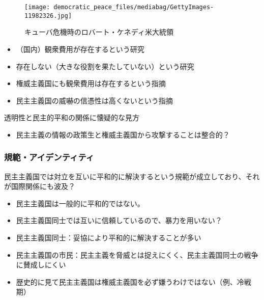 \documentclass[
  xelatex,
  ja=standard]{bxjsarticle}
\providecommand{\tightlist}{%
  \setlength{\itemsep}{0pt}\setlength{\parskip}{0pt}}\usepackage{longtable,booktabs,array}
\begin{document}
\begin{figure}[htpb]

{\centering \texttt{[image: democratic\_peace\_files/mediabag/GettyImages-11982326.jpg]}

}

\caption{キューバ危機時のロバート・ケネディ米大統領}

\end{figure}

\begin{itemize}
\tightlist
\item
  （国内）観衆費用が存在するという研究\citep{tomz2007, kurizaki2015}
\item
  存在しない（大きな役割を果たしていない）という研究\citep[\citet{katagiri2019}]{snyder2011, trachtenberg2012}
\item
  権威主義国にも観衆費用は存在するという指摘\citep{weiss2013, weeks2008}
\item
  民主主義国の威嚇の信憑性は高くないという指摘\citep{downes2012}
\end{itemize}

透明性と民主的平和の関係に懐疑的な見方\citep{finel1999}

\begin{itemize}
\tightlist
\item
  民主主義の情報の政策生と権威主義国から攻撃することは整合的？
\end{itemize}

\hypertarget{ux898fux7bc4ux30a2ux30a4ux30c7ux30f3ux30c6ux30a3ux30c6ux30a3}{%
\subsubsection{規範・アイデンティティ}\label{ux898fux7bc4ux30a2ux30a4ux30c7ux30f3ux30c6ux30a3ux30c6ux30a3}}

民主主義国では対立を互いに平和的に解決するという規範が成立しており、それが国際関係にも波及？\citep{doyle1986, risse1995}

\begin{itemize}
\tightlist
\item
  民主主義国は一般的に平和的ではない。
\item
  民主主義国同士では互いに信頼しているので、暴力を用いない？
\item
  民主主義国同士：妥協により平和的に解決することが多い\citep{mousseau1998, dixon1994}
\item
  民主主義国の市民：民主主義を脅威とは捉えにくく、民主主義国同士の戦争に賛成しにくい\citep{tomz2013}
\item
  歴史的に見て民主主義国は権威主義国を必ず嫌うわけではない（例、冷戦期）
\end{itemize}
\end{document}
